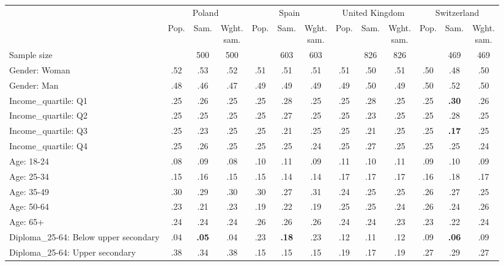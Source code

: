 
\begin{tabular}[t]{lcccccccccccc}
\toprule
\multicolumn{1}{c}{} & \multicolumn{3}{c}{Poland} & \multicolumn{3}{c}{Spain} & \multicolumn{3}{c}{United Kingdom} & \multicolumn{3}{c}{Switzerland} \\
\cmidrule(l{3pt}r{3pt}){2-4} \cmidrule(l{3pt}r{3pt}){5-7} \cmidrule(l{3pt}r{3pt}){8-10} \cmidrule(l{3pt}r{3pt}){11-13}
  & Pop. & Sam. & \makecell{Wght.\\sam.} & Pop. & Sam. & \makecell{Wght.\\sam.} & Pop. & Sam. & \makecell{Wght.\\sam.} & Pop. & Sam. & \makecell{Wght.\\sam.}\\
\midrule
Sample size &  & 500 & 500 &  & 603 & 603 &  & 826 & 826 &  & 469 & 469\\
\addlinespace
Gender: Woman & .52 & .53 & .52 & .51 & .51 & .51 & .51 & .50 & .51 & .50 & .48 & .50\\
Gender: Man & .48 & .46 & .47 & .49 & .49 & .49 & .49 & .50 & .49 & .50 & .52 & .50\\
\addlinespace
Income\_quartile: Q1 & .25 & .26 & .25 & .25 & .28 & .25 & .25 & .28 & .25 & .25 & \textbf{.30} & .26\\
Income\_quartile: Q2 & .25 & .25 & .25 & .25 & .27 & .25 & .25 & .23 & .25 & .25 & .28 & .25\\
Income\_quartile: Q3 & .25 & .23 & .25 & .25 & .21 & .25 & .25 & .21 & .25 & .25 & \textbf{.17} & .25\\
Income\_quartile: Q4 & .25 & .26 & .25 & .25 & .25 & .24 & .25 & .27 & .25 & .25 & .25 & .24\\
\addlinespace
Age: 18-24 & .08 & .09 & .08 & .10 & .11 & .09 & .11 & .10 & .11 & .09 & .10 & .09\\
Age: 25-34 & .15 & .16 & .15 & .15 & .14 & .14 & .17 & .17 & .17 & .16 & .18 & .17\\
Age: 35-49 & .30 & .29 & .30 & .30 & .27 & .31 & .24 & .25 & .25 & .26 & .27 & .25\\
Age: 50-64 & .23 & .21 & .23 & .19 & .22 & .19 & .25 & .25 & .24 & .26 & .24 & .26\\
Age: 65+ & .24 & .24 & .24 & .26 & .26 & .26 & .24 & .24 & .23 & .23 & .22 & .24\\
\addlinespace
Diploma\_25-64: Below upper secondary & .04 & \textbf{.05} & .04 & .23 & \textbf{.18} & .23 & .12 & .11 & .12 & .09 & \textbf{.06} & .09\\
Diploma\_25-64: Upper secondary & .38 & .34 & .38 & .15 & .15 & .15 & .19 & .17 & .19 & .27 & .29 & .27\\

\end{tabular}
